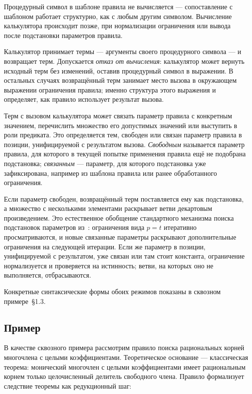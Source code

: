 \documentclass{intsys}
\begin{document}
Процедурный символ в шаблоне правила не вычисляется --- сопоставление
с шаблоном работает структурно, как с любым другим символом.
Вычисление калькулятора происходит позже, при нормализации
ограничения или вывода после подстановки параметров правила.

Калькулятор принимает термы --- аргументы своего процедурного
символа --- и возвращает терм. Допускается \emph{отказ от вычисления}:
калькулятор может вернуть исходный терм без изменений, оставив
процедурный символ в выражении. В остальных случаях возвращённый терм
занимает место вызова в окружающем выражении ограничения правила;
именно структура этого выражения и определяет, как правило использует
результат вызова.

Терм с вызовом калькулятора может связать параметр правила с
конкретным значением, перечислить множество его допустимых значений
или выступить в роли предиката. Это определяется тем, свободен или
связан параметр правила в позиции, унифицируемой с результатом
вызова. \emph{Свободным} называется параметр правила, для которого
в текущей попытке применения правила ещё не подобрана подстановка;
\emph{связанным} --- параметр, для которого подстановка уже
зафиксирована, например из шаблона правила или ранее обработанного
ограничения.

Если параметр свободен, возвращённый терм поставляется ему как
подстановка, а множество с несколькими элементами раскрывает ветви
декартовым произведением. Это естественное обобщение стандартного
механизма поиска подстановок параметров из~\cite{IS-Annenkov2026}:
ограничения вида $p = t$ итеративно просматриваются, и новые
связанные параметры раскрывают дополнительные ограничения на
следующей итерации. Если же параметр в позиции, унифицируемой с
результатом, уже связан или там стоит константа, ограничение
нормализуется и проверяется на истинность; ветви, на которых оно не
выполняется, отбрасываются.

Конкретные синтаксические формы обоих режимов показаны в сквозном
примере~\S1.3.

\subsection{Пример}

В качестве сквозного примера рассмотрим правило поиска рациональных
корней многочлена с целыми коэффициентами. Теоретическое основание ---
классическая теорема: монический многочлен с целыми коэффициентами
имеет рациональным корнем только целочисленный делитель свободного
члена. Правило формализует следствие теоремы как редукционный шаг:
\end{document}

